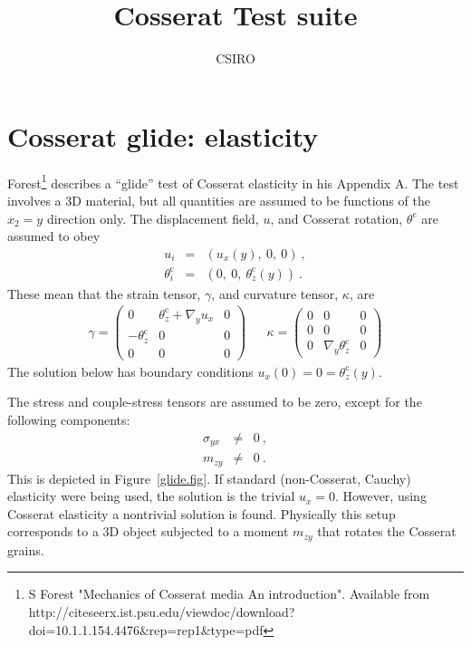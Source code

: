 \documentclass[]{scrreprt}
\newcommand{\thetac}{\theta^{\mathrm{c}}}
\begin{document}
\title{Cosserat Test suite}
\author{CSIRO}
\maketitle


\tableofcontents

\chapter{Cosserat glide: elasticity}

Forest\footnote{S Forest "Mechanics of Cosserat media An
  introduction".  Available from
  http://citeseerx.ist.psu.edu/viewdoc/download?doi=10.1.1.154.4476\&rep=rep1\&type=pdf}
describes a ``glide'' test of Cosserat elasticity in his Appendix A.
The test involves a 3D material, but all quantities are assumed to be
functions of the $x_{2} = y$ direction only.
The displacement field, $u$, and Cosserat rotation, $\thetac$
are assumed to obey
\begin{eqnarray}
u_{i} & = & (u_{x}(y),\ 0,\ 0) \ , \\
\thetac_{i} & = & (0,\ 0,\ \thetac_{z}(y)) \ .
\end{eqnarray}
These mean that the strain tensor, $\gamma$, and curvature tensor, $\kappa$, are
\begin{eqnarray}
\gamma = \left(
\begin{array}{ccc}
0 & \thetac_{z} + \nabla_{y}u_{x} & 0 \\
-\thetac_{z} & 0 & 0 \\
0 & 0 & 0
\end{array}
\right)
&&
\kappa = \left(
\begin{array}{ccc}
0 & 0 & 0 \\
0 & 0 & 0 \\
0 & \nabla_{y}\thetac_{z} & 0
\end{array}
\right)
\end{eqnarray}
The solution below has boundary conditions $u_{x}(0) = 0 =
\thetac_{z}(y)$.

The stress and couple-stress tensors are assumed to be zero, except for
the following components:
\begin{eqnarray}
\sigma_{yx} & \neq & 0 \ , \\
m_{zy} & \neq & 0 \ .
\end{eqnarray}
This is depicted in Figure~\ref{glide.fig}.
If standard (non-Cosserat, Cauchy) elasticity were being
used, the solution is the trivial $u_{x} = 0$.  However, using
Cosserat elasticity a nontrivial solution is found.
Physically this setup corresponds to a 3D object subjected to a moment $m_{zy}$ that
rotates the Cosserat grains.
\end{document}
